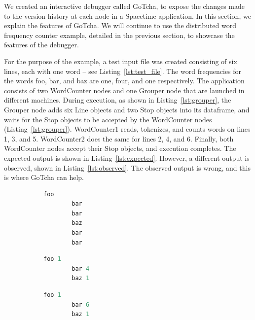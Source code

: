 We created an interactive debugger called GoTcha, to expose the changes made to the version history at each node in a Spacetime application. In this section, we explain the features of GoTcha. We will continue to use the distributed word frequency counter example, detailed in the previous section, to showcase the features of the debugger.

For the purpose of the example, a test input file was created consisting of six lines, each with one word -- see Listing~\ref{lst:test_file}. The word frequencies for the words foo, bar, and baz are one, four, and one respectively. The application consists of two WordCounter nodes and one Grouper node that are launched in different machines. During execution, as shown in Listing~\ref{lst:grouper}, the Grouper node adds six Line objects and two Stop objects into its dataframe, and waits for the Stop objects to be accepted by the WordCounter nodes (Listing~\ref{lst:grouper}). WordCounter1 reads, tokenizes, and counts words on lines 1, 3, and 5. WordCounter2 does the same for lines 2, 4, and 6. Finally, both WordCounter nodes accept their Stop objects, and execution completes. The expected output is shown in Listing~\ref{lst:expected}. However, a different output is observed, shown in Listing~\ref{lst:observed}. The observed output is wrong, and this is where GoTcha can help.

\begin{figure}%
  \begin{subfigure}[b]{0.3\linewidth}
        \begin{lstlisting}[language=Python,basicstyle=\small,
        label=lst:test_file, captionpos=b, caption=Input file.]
        foo
        bar
        bar
        baz
        bar
        bar
        \end{lstlisting}
  \end{subfigure}
  \begin{subfigure}[b]{.3\linewidth}
        \begin{lstlisting}[language=Python,basicstyle=\small,
        label=lst:expected, captionpos=b, caption=Expected output.]
        foo 1
        bar 4
        baz 1
        \end{lstlisting}
  \end{subfigure}
  \begin{subfigure}[b]{.3\linewidth}
        \begin{lstlisting}[language=Python,basicstyle=\small,
        label=lst:observed, captionpos=b, caption=Observed output.]
        foo 1
        bar 6
        baz 1
        \end{lstlisting}
  \end{subfigure}
\end{figure}


